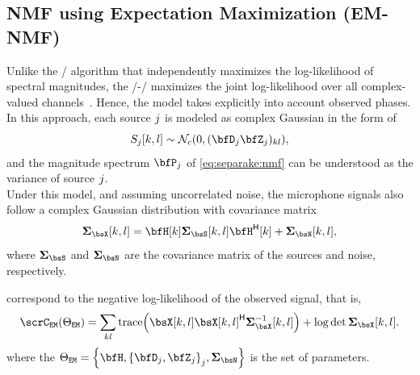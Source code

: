 \subsection{NMF using Expectation Maximization (EM-NMF)}\label{sec:separake:em}
Unlike the \MU/ algorithm that independently maximizes the log-likelihood of spectral magnitudes, the \EM/-\NMF/ maximizes the joint log-likelihood over all complex-valued channels~.
Hence, the model takes explicitly into account observed phases.
In this approach, each source $j$ is modeled as complex Gaussian in the form of
\begin{equation}
    \SRC_\idxSrc[k,l] \sim \mathcal{N}_c \kparen{0, (\mD_\idxSrc\mZ_\idxSrc)_{kl}},
\end{equation}
and the magnitude spectrum $\mP_\idxSrc$ of \eqref{eq:separake:nmf} can be understood as the variance of source $j$.
\\Under this model, and assuming uncorrelated noise, the microphone signals also follow a complex Gaussian distribution with covariance matrix
\begin{equation}
    \mSigma_{\MICS}[k,l] = \FLTSS[k] \mSigma_{\SRCS} [k,l] \khermitian{\FLTSS}[k] + \mSigma_{\NSES}[k,l]
    ,
\end{equation}
where $\mSigma_{\SRCS}$ and $\mSigma_{\NSES}$ are the covariance matrix of the sources and noise, respectively.

 correspond to the negative log-likelihood of the observed signal, that is,
\begin{equation}\label{eq:separake:loglike}
    \scrC_{\mathtt{EM}}(\Theta_{\mathtt{EM}}) = \sum\limits_{kl} \trace\kparen{\MICS[k,l] \khermitian{\MICS[k,l]} \mSigma_{\MICS}^{-1}[k,l]} \\
    + \log\det\mSigma_{\MICS}[k,l].
\end{equation}
where the $\Theta_{\mathtt{EM}} = \set{\FLTSS, \set{\mD_\idxSrc, \mZ_\idxSrc}_\idxSrc, \mSigma_{\NSES}}$ is the set of parameters.

